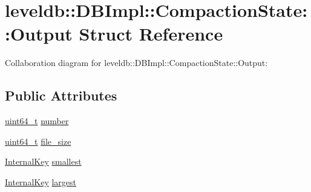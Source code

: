 \hypertarget{structleveldb_1_1_d_b_impl_1_1_compaction_state_1_1_output}{\section{leveldb\-:\-:D\-B\-Impl\-:\-:Compaction\-State\-:\-:Output Struct Reference}
\label{structleveldb_1_1_d_b_impl_1_1_compaction_state_1_1_output}
}


Collaboration diagram for leveldb\-:\-:D\-B\-Impl\-:\-:Compaction\-State\-:\-:Output\-:
\subsection*{Public Attributes}
\begin{DoxyCompactItemize}
\item 
\hyperlink{stdint_8h_aaa5d1cd013383c889537491c3cfd9aad}{uint64\-\_\-t} \hyperlink{structleveldb_1_1_d_b_impl_1_1_compaction_state_1_1_output_aa4b759dca2a83bdb8d9edbf7e2d213e2}{number}
\item 
\hyperlink{stdint_8h_aaa5d1cd013383c889537491c3cfd9aad}{uint64\-\_\-t} \hyperlink{structleveldb_1_1_d_b_impl_1_1_compaction_state_1_1_output_a37906cee65a9d1873b7b7a4169f22402}{file\-\_\-size}
\item 
\hyperlink{classleveldb_1_1_internal_key}{Internal\-Key} \hyperlink{structleveldb_1_1_d_b_impl_1_1_compaction_state_1_1_output_a88ada857d0cf32ae8e76d7baf4e80c69}{smallest}
\item 
\hyperlink{classleveldb_1_1_internal_key}{Internal\-Key} \hyperlink{structleveldb_1_1_d_b_impl_1_1_compaction_state_1_1_output_a6e257f231aba82d20cb7199a552b2a63}{largest}
\end{DoxyCompactItemize}


